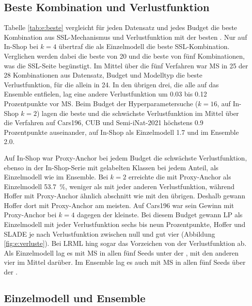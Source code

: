 \subsection{Beste Kombination und Verlustfunktion}
\label{sec:e:beste}

Tabelle \ref{tab:e:beste} vergleicht für jeden Datensatz und jedes Budget die beste Kombination aus \ac{SSL}-Mechanismus und Verlustfunktion mit der besten \UEBL. Nur auf In-Shop bei $k=4$ übertraf die \UEBL als Einzelmodell die beste \ac{SSL}-Kombination. Verglichen werden dabei die beste von 20 und die beste von fünf Kombinationen, was die \ac{SSL}-Seite begünstigt. Im Mittel über die fünf Verfahren war \ac{MS} in 25 der 28 Kombinationen aus Datensatz, Budget und Modelltyp die beste Verlustfunktion, für die \UEBL allein in 24. In den übrigen drei, die alle auf das Ensemble entfielen, lag eine andere Verlustfunktion um \num{0.03} bis \num{0.12} Prozentpunkte vor \ac{MS}. Beim Budget der Hyperparametersuche ($k=16$, auf In-Shop $k=2$) lagen die beste und die schwächste Verlustfunktion im Mittel über die Verfahren auf Cars196, \ac{CUB} und Semi-iNat-2021 höchstens \num{0.9} Prozentpunkte auseinander, auf In-Shop als Einzelmodell \num{1.7} und im Ensemble \num{2.0}.



Auf In-Shop war Proxy-Anchor bei jedem Budget die schwächste Verlustfunktion, ebenso in der In-Shop-Serie mit gelabelten Klassen bei jedem Anteil, als Einzelmodell wie im Ensemble. Bei $k=2$ erreichte die \UEBL mit Proxy-Anchor als Einzelmodell \qty{53.7}{\percent}, weniger als mit jeder anderen Verlustfunktion, während Hoffer mit Proxy-Anchor ähnlich abschnitt wie mit den übrigen. Deshalb gewann Hoffer dort mit Proxy-Anchor am meisten. Auf Cars196 war sein Gewinn mit Proxy-Anchor bei $k=4$ dagegen der kleinste. Bei diesem Budget gewann \ac{LP} als Einzelmodell mit jeder Verlustfunktion sechs bis neun Prozentpunkte, Hoffer und \ac{SLADE} je nach Verlustfunktion zwischen null und gut vier (Abbildung \ref{fig:e:verluste}). Bei \ac{LRML} hing sogar das Vorzeichen von der Verlustfunktion ab. Als Einzelmodell lag es mit \ac{MS} in allen fünf Seeds unter der \UEBL, mit den anderen vier im Mittel darüber. Im Ensemble lag es auch mit \ac{MS} in allen fünf Seeds über der \UEBL.

\subsection{Einzelmodell und Ensemble}
\label{sec:e:faktoren}

